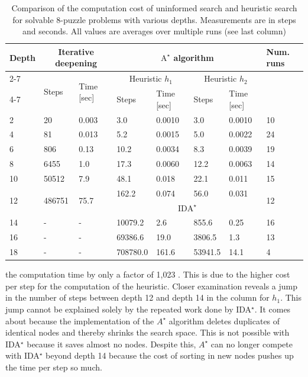 \documentclass[10pt]{book}
\begin{document}
\begin{table}[htbp]
\centering
\caption{Comparison of the computation cost of uninformed search and heuristic search for solvable 8-puzzle problems with various depths. Measurements are in steps and seconds. All values are averages over multiple runs (see last column)}
\begin{tabular}{|l|l|l|l|l|l|l|l|}
\hline
\multirow[t]{3}{*}{Depth} & \multicolumn{2}{|c|}{Iterative deepening} & \multicolumn{4}{|c|}{$\mathrm{A}^{\star}$ algorithm} & \multirow[t]{3}{*}{Num. runs} \\
\cline{2-7}
 & \multirow[t]{2}{*}{Steps} & \multirow[t]{2}{*}{Time [sec]} & \multicolumn{2}{|c|}{Heuristic $h_{1}$} & \multicolumn{2}{|c|}{Heuristic $h_{2}$} &  \\
\cline{4-7}
 &  &  & Steps & Time [sec] & Steps & Time [sec] &  \\
\hline
2 & 20 & 0.003 & 3.0 & 0.0010 & 3.0 & 0.0010 & 10 \\
\hline
4 & 81 & 0.013 & 5.2 & 0.0015 & 5.0 & 0.0022 & 24 \\
\hline
6 & 806 & 0.13 & 10.2 & 0.0034 & 8.3 & 0.0039 & 19 \\
\hline
8 & 6455 & 1.0 & 17.3 & 0.0060 & 12.2 & 0.0063 & 14 \\
\hline
10 & 50512 & 7.9 & 48.1 & 0.018 & 22.1 & 0.011 & 15 \\
\hline
\multirow[t]{2}{*}{12} & \multirow[t]{2}{*}{486751} & \multirow[t]{2}{*}{75.7} & 162.2 & 0.074 & 56.0 & 0.031 & \multirow[t]{2}{*}{12} \\
\cline{4-7}
 &  &  & \multicolumn{4}{|c|}{$\mathrm{IDA}^{\star}$} &  \\
\hline
14 & - & - & 10079.2 & 2.6 & 855.6 & 0.25 & 16 \\
\hline
16 & - & - & 69386.6 & 19.0 & 3806.5 & 1.3 & 13 \\
\hline
18 & - & - & 708780.0 & 161.6 & 53941.5 & 14.1 & 4 \\
\hline
\end{tabular}
\end{table}

the computation time by only a factor of 1,023 . This is due to the higher cost per step for the computation of the heuristic.
Closer examination reveals a jump in the number of steps between depth 12 and depth 14 in the column for $h_{1}$. This jump cannot be explained solely by the repeated work done by IDA$^{\star}$. It comes about because the implementation of the $A^{\star}$ algorithm deletes duplicates of identical nodes and thereby shrinks the search space. This is not possible with IDA$^{\star}$ because it saves almost no nodes. Despite this, $A^{\star}$ can no longer compete with IDA$^{\star}$ beyond depth 14 because the cost of sorting in new nodes pushes up the time per step so much.
\end{document}
